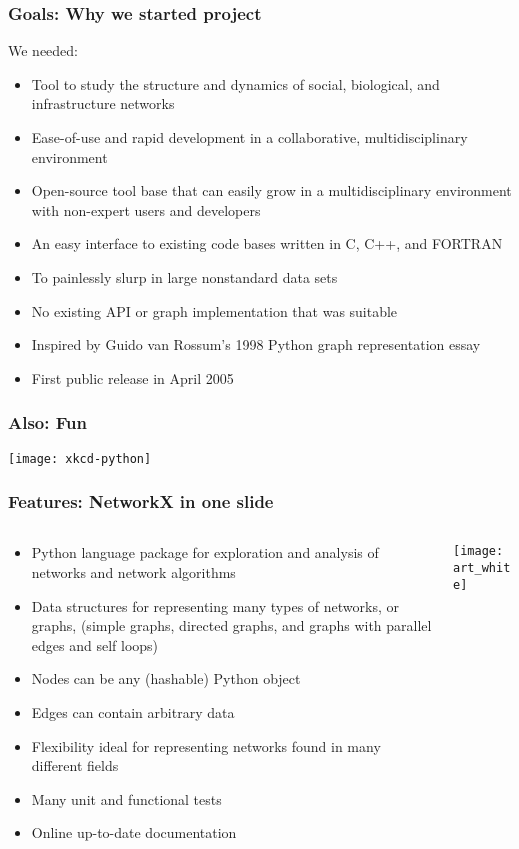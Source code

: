 \documentclass[xcolor=dvipsnames, 9pt]{beamer}
\begin{document}
\begin{frame}
\frametitle{Goals: Why we started project}
\begin{block}
{We needed:}
\begin{itemize}
\item Tool to study the structure and
dynamics of social, biological, and infrastructure networks
\item Ease-of-use and rapid
development in a collaborative, multidisciplinary environment 
\item Open-source tool base that can easily
grow in a multidisciplinary environment with non-expert users and developers
\item An easy interface to 
existing code bases written in C, C++, and FORTRAN 
\item To painlessly slurp in large nonstandard data sets 
\end{itemize}
\end{block}
\begin{itemize}
\item No existing API or graph implementation that was suitable 
\item Inspired by Guido van Rossum's 1998 Python graph representation essay 
\item First public release in April 2005
\end{itemize}
\end{frame}


\begin{frame}
\frametitle{Also: Fun}
\centerline{\texttt{[image: xkcd-python]}}
\end{frame}




\begin{frame}
\frametitle{Features: NetworkX in one slide}
\begin{columns}[c]
\begin{column}{0.65\textwidth}
\begin{itemize}
\item  Python language package for exploration and analysis of
networks and network algorithms  
\item Data structures for representing many types of networks, or graphs,
(simple graphs, directed graphs, and graphs with parallel edges and
  self loops)
\item Nodes can be any (hashable) Python object
\item Edges can contain arbitrary data
\item Flexibility ideal for representing networks found
in many different fields
\item Many unit and functional tests 
\item Online up-to-date documentation
\end{itemize}
\end{column}
\begin{column}{0.35\textwidth}
\centerline{\texttt{[image: art\_white]}}
\end{column}
\end{columns}
\end{frame}
\end{document}
